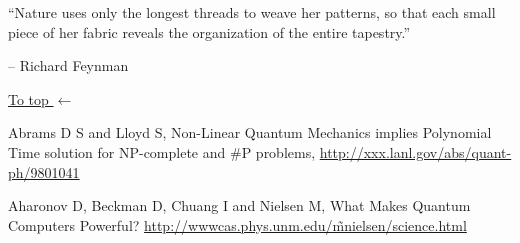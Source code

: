 \documentclass{article}
\def\pagedone{\newpage}
\def\tthdump#1{#1}
\begin{document}
``Nature uses only the longest threads to weave her patterns, so that each
small piece of her fabric reveals the organization of the entire tapestry.''

-- Richard Feynman
\pagedone
\pagedone

\footnotesize

 
\tthdump{\hypertarget{References}{}\hyperlink{Our general topics:}{\hfil To top $\leftarrow$}}
 
\begin{thebibliography}{12}




Abrams D S and Lloyd S, 
Non-Linear Quantum Mechanics implies Polynomial Time 
solution for NP-complete and $\#$P problems,
\hyperref{http://xxx.lanl.gov/abs/quant-ph/9801041}{}{}
{http://xxx.lanl.gov/abs/quant-ph/9801041}


% 
% 
% 
% 
% 
% 
% 
% 
% 
Aharonov D, Beckman D, Chuang I and  Nielsen M,
What Makes Quantum Computers Powerful? 
\hyperref{http://wwwcas.phys.unm.edu/\~mnielsen/science.html}{}{}
{http://wwwcas.phys.unm.edu/\~mnielsen/science.html}
% 
% 
% 


\end{thebibliography}
\end{document}

